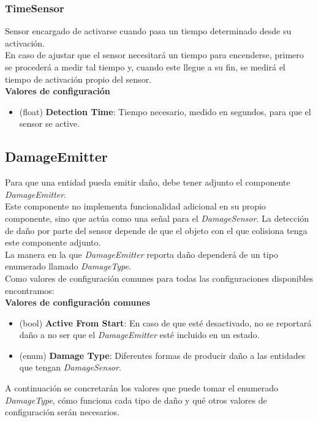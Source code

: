 \subsubsection{TimeSensor}

Sensor encargado de activarse cuando pasa un tiempo determinado desde su activación.\\
En caso de ajustar que el sensor necesitará un tiempo para encenderse, primero se procederá a medir tal tiempo y, cuando este llegue a su fin, se medirá el tiempo de activación propio del sensor.\\

\textbf{Valores de configuración}
	\begin{itemize}
	        \item (float) \textbf{Detection Time}: Tiempo necesario, medido en segundos, para que el sensor se active.
	 \end{itemize}

\subsection{DamageEmitter}

Para que una entidad pueda emitir daño, debe tener adjunto el componente \textit{DamageEmitter}.\\
Este componente no implementa funcionalidad adicional en su propio componente, sino que actúa como una señal para el \textit{DamageSensor}. La detección de daño por parte del sensor depende de que el objeto con el que colisiona tenga este componente adjunto.\\

La manera en la que \textit{DamageEmitter} reporta daño dependerá de un tipo enumerado llamado \textit{DamageType}.\\
Como valores de configuración comunes para todas las configuraciones disponibles encontramos:\\

\textbf{Valores de configuración comunes}
\begin{itemize}
	\item (bool) \textbf{Active From Start}: En caso de que esté desactivado, no se reportará daño a no ser que el \textit{DamageEmitter} esté incluido en un estado.
	\item (enum) \textbf{Damage Type}: Diferentes formas de producir daño a las entidades que tengan \textit{DamageSensor}.
\end{itemize}

A continuación se concretarán los valores que puede tomar el enumerado \textit{DamageType}, cómo funciona cada tipo de daño y qué otros valores de configuración serán necesarios.\\

